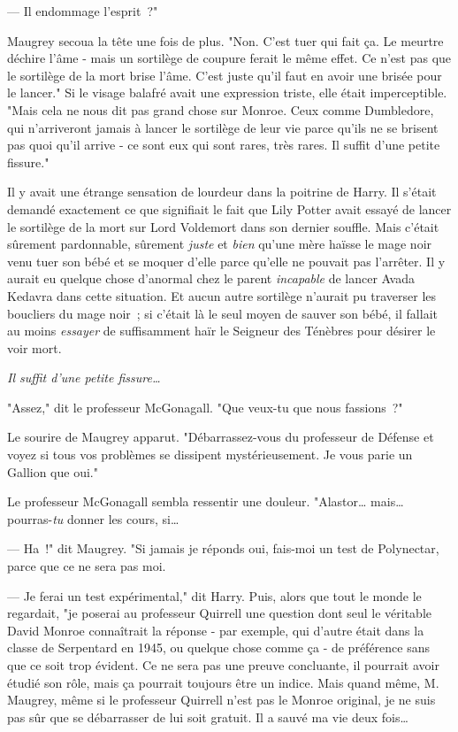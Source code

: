 --- Il endommage l'esprit~?"

Maugrey secoua la tête une fois de plus. "Non. C'est tuer qui fait ça. Le meurtre déchire l'âme - mais un sortilège de coupure ferait le même effet. Ce n'est pas que le sortilège de la mort brise l'âme. C'est juste qu'il faut en avoir une brisée pour le lancer." Si le visage balafré avait une expression triste, elle était imperceptible. "Mais cela ne nous dit pas grand chose sur Monroe. Ceux comme Dumbledore, qui n'arriveront jamais à lancer le sortilège de leur vie parce qu'ils ne se brisent pas quoi qu'il arrive - ce sont eux qui sont rares, très rares. Il suffit d'une petite fissure."

Il y avait une étrange sensation de lourdeur dans la poitrine de Harry. Il s'était demandé exactement ce que signifiait le fait que Lily Potter avait essayé de lancer le sortilège de la mort sur Lord Voldemort dans son dernier souffle. Mais c'était sûrement pardonnable, sûrement \emph{juste} et \emph{bien} qu'une mère haïsse le mage noir venu tuer son bébé et se moquer d'elle parce qu'elle ne pouvait pas l'arrêter. Il y aurait eu quelque chose d'anormal chez le parent \emph{incapable} de lancer Avada Kedavra dans cette situation. Et aucun autre sortilège n'aurait pu traverser les boucliers du mage noir~; si c'était là le seul moyen de sauver son bébé, il fallait au moins \emph{essayer} de suffisamment haïr le Seigneur des Ténèbres pour désirer le voir mort.

\emph{Il suffit d'une petite fissure…}

"Assez," dit le professeur McGonagall. "Que veux-tu que nous fassions~?"

Le sourire de Maugrey apparut. "Débarrassez-vous du professeur de Défense et voyez si tous vos problèmes se dissipent mystérieusement. Je vous parie un Gallion que oui."

Le professeur McGonagall sembla ressentir une douleur. "Alastor… mais… pourras-\emph{tu} donner les cours, si…

--- Ha~!" dit Maugrey. "Si jamais je réponds oui, fais-moi un test de Polynectar, parce que ce ne sera pas moi.

--- Je ferai un test expérimental," dit Harry. Puis, alors que tout le monde le regardait, "je poserai au professeur Quirrell une question dont seul le véritable David Monroe connaîtrait la réponse - par exemple, qui d'autre était dans la classe de Serpentard en 1945, ou quelque chose comme ça - de préférence sans que ce soit trop évident. Ce ne sera pas une preuve concluante, il pourrait avoir étudié son rôle, mais ça pourrait toujours être un indice. Mais quand même, M. Maugrey, même si le professeur Quirrell n'est pas le Monroe original, je ne suis pas sûr que se débarrasser de lui soit gratuit. Il a sauvé ma vie deux fois…

